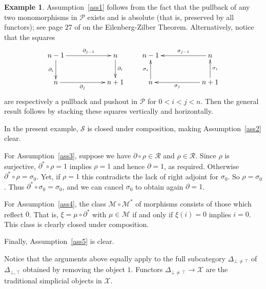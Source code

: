 \documentclass[a4paper,12pt,reqno]{amsart}
\theoremstyle{definition}
\newtheorem{example}[theorem]{Example}
\theoremstyle{fact}
\theoremstyle{genquest}
\theoremstyle{step}
\newcommand{\ra}{\rightarrow}
\def\CM{{\mathscr M}}
\def\CP{{\mathscr P}}
\def\CR{{\mathscr R}}
\def\CS{{\mathscr S}}
\def\CX{{\mathscr X}}
\begin{document}
\begin{example}
Assumption~\ref{ass1} follows from the fact that the pullback of any two 
monomorphisms in $\CP$ exists and is absolute (that is, preserved by all functors); 
see page 27 of \cite{GabZis} on the Eilenberg-Zilber Theorem. 
Alternatively, notice that the squares
$$
\xymatrix{
n-1 \ar[rr]^-{\partial_{j-1}} \ar[d]_-{\partial_{i}} && n \ar[d]^-{\partial_{i}} \\
n \ar[rr]_-{\partial_{j}}  && n+1 }
\qquad
\xymatrix{
n-1  && n \ar[ll]_-{\sigma_{j-1}} \\
n \ar[u]^-{\sigma_i}  && n+1 \ar[u]_-{\sigma_i} \ar[ll]^-{\sigma_j}}
$$
are respectively a pullback and pushout in $\CP$ for $0< i < j < n$.
Then the general result follows by stacking these squares vertically and horizontally.

In the present example, $\CS$ is closed under composition, making Assumption~\ref{ass2} clear.

For Assumption~\ref{ass3}, suppose we have $\partial \circ \rho \in \CR$ and $\rho \in \CR$. Since $\rho$ is surjective, $\partial^* \circ \rho = 1$ implies $\rho = 1$ 
and hence $\partial = 1$, as required. Otherwise $\partial^* \circ \rho = \sigma_0$.
Yet, if $\rho = 1$ this contradicts the lack of right adjoint for $\sigma_0$.
So $\rho = \sigma_0$. Thus $\partial^* \circ \sigma_0 = \sigma_0$, and we can
cancel $\sigma_0$ to obtain again $\partial = 1$. 

For Assumption~\ref{ass4}, the class $\CM\circ \CM^*$ of morphisms consists of
those which reflect $0$. That is, $\xi = \mu \circ \partial^*$ with
$\mu\in \CM$ if and only if $\xi(i)=0$ implies $i=0$. This class is
clearly closed under composition. 

Finally, Assumption~\ref{ass5} is clear. 

Notice that the arguments above equally apply to the full subcategory  
$\Delta_{\bot\neq\top}$ of $\Delta_{\bot,\top}$ obtained by removing the object $1$.
Functors $\Delta_{\bot\neq \top}\ra \CX$ are the traditional simplicial objects in $\CX$. 
\end{example}
\end{document}
